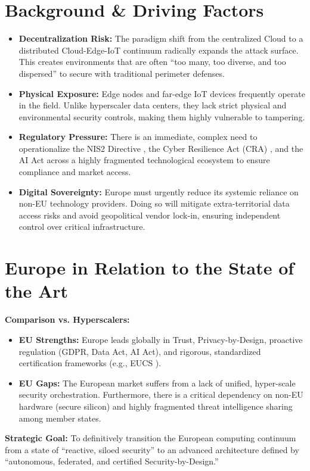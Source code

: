 \documentclass[12pt,a4paper]{report}
\begin{document}
\section{Background \& Driving Factors}
\begin{itemize}
    \item \textbf{Decentralization Risk:} The paradigm shift from the centralized Cloud to a distributed Cloud-Edge-IoT continuum radically expands the attack surface. This creates environments that are often ``too many, too diverse, and too dispersed'' to secure with traditional perimeter defenses.
    \item \textbf{Physical Exposure:} Edge nodes and far-edge IoT devices frequently operate in the field. Unlike hyperscaler data centers, they lack strict physical and environmental security controls, making them highly vulnerable to tampering.
    \item \textbf{Regulatory Pressure:} There is an immediate, complex need to operationalize the NIS2 Directive \cite{nis2}, the Cyber Resilience Act (CRA) \cite{cra}, and the AI Act \cite{aiact} across a highly fragmented technological ecosystem to ensure compliance and market access.
    \item \textbf{Digital Sovereignty:} Europe must urgently reduce its systemic reliance on non-EU technology providers. Doing so will mitigate extra-territorial data access risks and avoid geopolitical vendor lock-in, ensuring independent control over critical infrastructure.
\end{itemize}

\section{Europe in Relation to the State of the Art}
\textbf{Comparison vs. Hyperscalers:}
\begin{itemize}
    \item \textbf{EU Strengths:} Europe leads globally in Trust, Privacy-by-Design, proactive regulation (GDPR, Data Act, AI Act), and rigorous, standardized certification frameworks (e.g., EUCS \cite{eucs}).
    \item \textbf{EU Gaps:} The European market suffers from a lack of unified, hyper-scale security orchestration. Furthermore, there is a critical dependency on non-EU hardware (secure silicon) and highly fragmented threat intelligence sharing among member states.
\end{itemize}
\textbf{Strategic Goal:} To definitively transition the European computing continuum from a state of ``reactive, siloed security'' to an advanced architecture defined by ``autonomous, federated, and certified Security-by-Design.''
\end{document}
